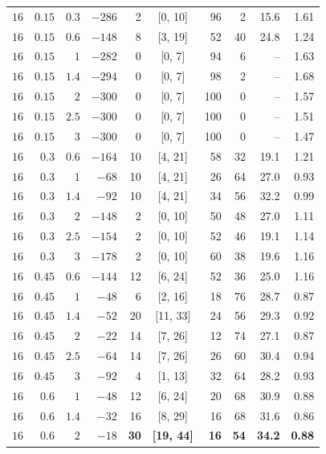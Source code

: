 \begin{table}[t]
\begin{tabular}{rrrrrcrrrr}
\midrule
$16$ & $0.15$ & $0.3$ & $-286$ & 2 & [0, 10] & 96 & 2 & 15.6 & 1.61 \\
$16$ & $0.15$ & $0.6$ & $-148$ & 8 & [3, 19] & 52 & 40 & 24.8 & 1.24 \\
$16$ & $0.15$ & $1$ & $-282$ & 0 & [0, 7] & 94 & 6 & -- & 1.63 \\
$16$ & $0.15$ & $1.4$ & $-294$ & 0 & [0, 7] & 98 & 2 & -- & 1.68 \\
$16$ & $0.15$ & $2$ & $-300$ & 0 & [0, 7] & 100 & 0 & -- & 1.57 \\
$16$ & $0.15$ & $2.5$ & $-300$ & 0 & [0, 7] & 100 & 0 & -- & 1.51 \\
$16$ & $0.15$ & $3$ & $-300$ & 0 & [0, 7] & 100 & 0 & -- & 1.47 \\
$16$ & $0.3$ & $0.6$ & $-164$ & 10 & [4, 21] & 58 & 32 & 19.1 & 1.21 \\
$16$ & $0.3$ & $1$ & $-68$ & 10 & [4, 21] & 26 & 64 & 27.0 & 0.93 \\
$16$ & $0.3$ & $1.4$ & $-92$ & 10 & [4, 21] & 34 & 56 & 32.2 & 0.99 \\
$16$ & $0.3$ & $2$ & $-148$ & 2 & [0, 10] & 50 & 48 & 27.0 & 1.11 \\
$16$ & $0.3$ & $2.5$ & $-154$ & 2 & [0, 10] & 52 & 46 & 19.1 & 1.14 \\
$16$ & $0.3$ & $3$ & $-178$ & 2 & [0, 10] & 60 & 38 & 19.6 & 1.16 \\
$16$ & $0.45$ & $0.6$ & $-144$ & 12 & [6, 24] & 52 & 36 & 25.0 & 1.16 \\
$16$ & $0.45$ & $1$ & $-48$ & 6 & [2, 16] & 18 & 76 & 28.7 & 0.87 \\
$16$ & $0.45$ & $1.4$ & $-52$ & 20 & [11, 33] & 24 & 56 & 29.3 & 0.92 \\
$16$ & $0.45$ & $2$ & $-22$ & 14 & [7, 26] & 12 & 74 & 27.1 & 0.87 \\
$16$ & $0.45$ & $2.5$ & $-64$ & 14 & [7, 26] & 26 & 60 & 30.4 & 0.94 \\
$16$ & $0.45$ & $3$ & $-92$ & 4 & [1, 13] & 32 & 64 & 28.2 & 0.93 \\
$16$ & $0.6$ & $1$ & $-48$ & 12 & [6, 24] & 20 & 68 & 30.9 & 0.88 \\
$16$ & $0.6$ & $1.4$ & $-32$ & 16 & [8, 29] & 16 & 68 & 31.6 & 0.86 \\
{\boldmath\bfseries $16$} & {\boldmath\bfseries $0.6$} & {\boldmath\bfseries $2$} & {\boldmath\bfseries $-18$} & {\boldmath\bfseries 30} & {\boldmath\bfseries [19, 44]} & {\boldmath\bfseries 16} & {\boldmath\bfseries 54} & {\boldmath\bfseries 34.2} & {\boldmath\bfseries 0.88} \\

\end{tabular}
\end{table}

